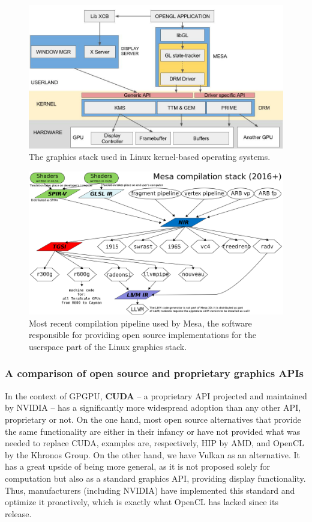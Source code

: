 \documentclass[conference, onecolumn]{IEEEtran}
\begin{document}
\begin{figure}[H]
    \centering
    \includegraphics[width=0.8\linewidth]{linux-stack.jpeg}
    \caption{The graphics stack used in Linux kernel-based operating systems.}
    \label{fig:linux-gs}
\end{figure}

\begin{figure}[H]
    \centering
    \includegraphics[width=0.8\linewidth]{mesa.png}
    \caption{Most recent compilation pipeline used by Mesa, the software
        responsible for providing open source implementations for the userspace
        part of the Linux graphics stack.}
    \label{fig:mesa-cs}
\end{figure}

\subsubsection{A comparison of open source and proprietary graphics APIs} \label{sec:proposal:gapis-comparison}


In the context of GPGPU, \textbf{CUDA} -- a proprietary API
projected and maintained by NVIDIA -- has a significantly more widespread
adoption than any other API, proprietary or not.
On the one hand, most open source alternatives that provide the same
functionality are either in their infancy or have not provided what was needed
to replace CUDA, examples are, respectively, HIP by AMD, and OpenCL by the
Khronos Group.
On the other hand, we have Vulkan as an alternative.
It has a great upside of being more general, as it is not proposed solely for
computation but also as a standard graphics API, providing display
functionality.
Thus, manufacturers (including NVIDIA) have implemented this standard and
optimize it proactively, which is exactly what OpenCL has lacked since its
release.
\end{document}

